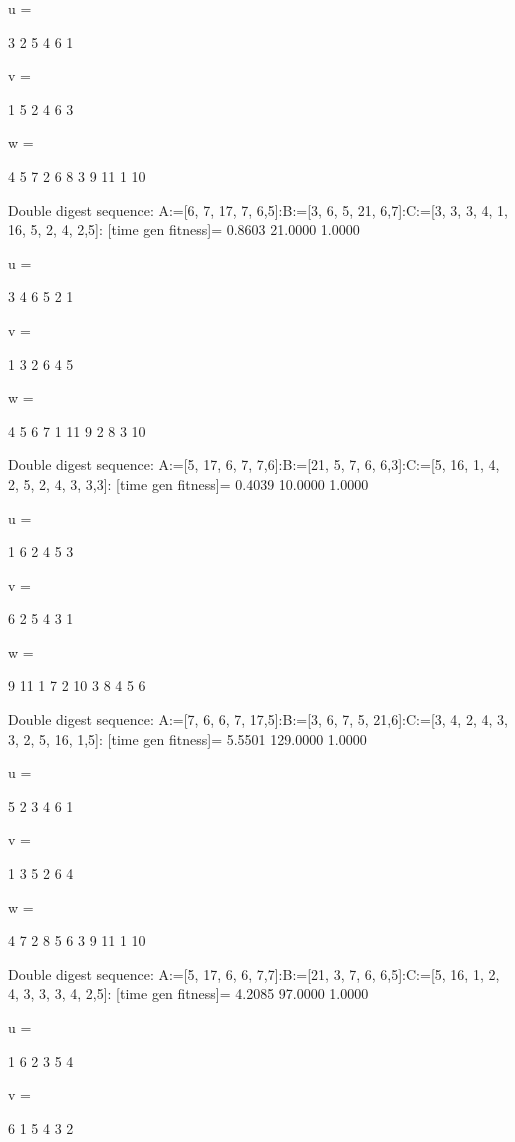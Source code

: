 u =

     3     2     5     4     6     1


v =

     1     5     2     4     6     3


w =

     4     5     7     2     6     8     3     9    11     1    10

Double digest sequence:
A:=[6, 7, 17, 7, 6,5]:B:=[3, 6, 5, 21, 6,7]:C:=[3, 3, 3, 4, 1, 16, 5, 2, 4, 2,5]:
[time gen fitness]=
    0.8603   21.0000    1.0000


u =

     3     4     6     5     2     1


v =

     1     3     2     6     4     5


w =

     4     5     6     7     1    11     9     2     8     3    10

Double digest sequence:
A:=[5, 17, 6, 7, 7,6]:B:=[21, 5, 7, 6, 6,3]:C:=[5, 16, 1, 4, 2, 5, 2, 4, 3, 3,3]:
[time gen fitness]=
    0.4039   10.0000    1.0000


u =

     1     6     2     4     5     3


v =

     6     2     5     4     3     1


w =

     9    11     1     7     2    10     3     8     4     5     6

Double digest sequence:
A:=[7, 6, 6, 7, 17,5]:B:=[3, 6, 7, 5, 21,6]:C:=[3, 4, 2, 4, 3, 3, 2, 5, 16, 1,5]:
[time gen fitness]=
    5.5501  129.0000    1.0000


u =

     5     2     3     4     6     1


v =

     1     3     5     2     6     4


w =

     4     7     2     8     5     6     3     9    11     1    10

Double digest sequence:
A:=[5, 17, 6, 6, 7,7]:B:=[21, 3, 7, 6, 6,5]:C:=[5, 16, 1, 2, 4, 3, 3, 3, 4, 2,5]:
[time gen fitness]=
    4.2085   97.0000    1.0000


u =

     1     6     2     3     5     4


v =

     6     1     5     4     3     2


